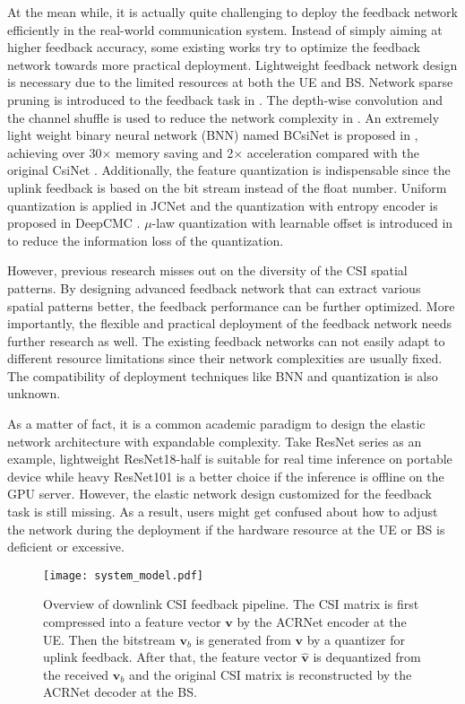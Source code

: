 \documentclass[12pt, draftclsnofoot, onecolumn]{IEEEtran}
\begin{document}
At the mean while, it is actually quite challenging to deploy the feedback network efficiently in the real-world communication system. Instead of simply aiming at higher feedback accuracy, some existing works try to optimize the feedback network towards more practical deployment. Lightweight feedback network design is necessary due to the limited resources at both the UE and BS. Network sparse pruning is introduced to the feedback task in \cite{guo2020compression}. The depth-wise convolution and the channel shuffle is used to reduce the network complexity in \cite{cao2020lightweight}. An extremely light weight binary neural network (BNN) named BCsiNet is proposed in \cite{lu2021binary}, achieving over 30$\times$ memory saving and 2$\times$ acceleration compared with the original CsiNet \cite{wen2018deep}. Additionally, the feature quantization is indispensable since the uplink feedback is based on the bit stream instead of the float number. Uniform quantization is applied in JCNet \cite{lu2019bit} and the quantization with entropy encoder is proposed in DeepCMC \cite{yang2019deepcmc}. $\mu$-law quantization with learnable offset is introduced in \cite{guo2020convolutional} to reduce the information loss of the quantization.

However, previous research misses out on the diversity of the CSI spatial patterns. By designing advanced feedback network that can extract various spatial patterns better, the feedback performance can be further optimized. More importantly, the flexible and practical deployment of the feedback network needs further research as well. The existing feedback networks can not easily adapt to different resource limitations since their network complexities are usually fixed. The compatibility of deployment techniques like BNN and quantization is also unknown.

As a matter of fact, it is a common academic paradigm to design the elastic network architecture with expandable complexity. Take ResNet series \cite{he2016deep} as an example, lightweight ResNet18-half is suitable for real time inference on portable device while heavy ResNet101 is a better choice if the inference is offline on the GPU server. However, the elastic network design customized for the feedback task is still missing. As a result, users might get confused about how to adjust the network during the deployment if the hardware resource at the UE or BS is deficient or excessive.

\begin{figure}[t]
\centering
\texttt{[image: system\_model.pdf]}
\caption{Overview of downlink CSI feedback pipeline. The CSI matrix is first compressed into a feature vector $\mathbf{v}$ by the ACRNet encoder at the UE. Then the bitstream $\mathbf{v}_b$ is generated from $\mathbf{v}$ by a quantizer for uplink feedback. After that, the feature vector $\hat{\mathbf{v}}$ is dequantized from the received $\mathbf{v}_b$ and the original CSI matrix is reconstructed by the ACRNet decoder at the BS.}
\label{System Model}
\end{figure}
\end{document}

